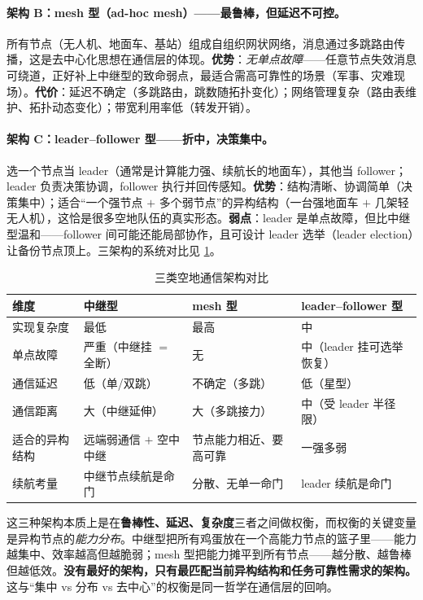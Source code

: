 \paragraph{架构 B：mesh 型（ad-hoc mesh）——最鲁棒，但延迟不可控。}
所有节点（无人机、地面车、基站）组成自组织网状网络，消息通过多跳路由传播，这是去中心化思想在通信层的体现。\textbf{优势}：\emph{无单点故障}——任意节点失效消息可绕道，正好补上中继型的致命弱点，最适合需高可靠性的场景（军事、灾难现场）。\textbf{代价}：延迟不确定（多跳路由，跳数随拓扑变化）；网络管理复杂（路由表维护、拓扑动态变化）；带宽利用率低（转发开销）。

\paragraph{架构 C：leader--follower 型——折中，决策集中。}
选一个节点当 leader（通常是计算能力强、续航长的地面车），其他当 follower；leader 负责决策协调，follower 执行并回传感知。\textbf{优势}：结构清晰、协调简单（决策集中）；适合“一个强节点 $+$ 多个弱节点”的异构结构（一台强地面车 $+$ 几架轻无人机），这恰是很多空地队伍的真实形态。\textbf{弱点}：leader 是单点故障，但比中继型温和——follower 间可能还能局部协作，且可设计 leader 选举（leader election）让备份节点顶上。三架构的系统对比见 \cref{tab:hmr-comm-compare}。

\begin{table}[H]\centering\small
\caption{三类空地通信架构对比}
\label{tab:hmr-comm-compare}
\begin{tabular}{llll}
\toprule
维度 & 中继型 & mesh 型 & leader--follower 型 \\
\midrule
实现复杂度 & 最低 & 最高 & 中 \\
单点故障 & 严重（中继挂 $=$ 全断） & 无 & 中（leader 挂可选举恢复） \\
通信延迟 & 低（单/双跳） & 不确定（多跳） & 低（星型） \\
通信距离 & 大（中继延伸） & 大（多跳接力） & 中（受 leader 半径限） \\
适合的异构结构 & 远端弱通信 $+$ 空中中继 & 节点能力相近、要高可靠 & 一强多弱 \\
续航考量 & 中继节点续航是命门 & 分散、无单一命门 & leader 续航是命门 \\
\bottomrule
\end{tabular}
\end{table}

\begin{insight}
这三种架构本质上是在\textbf{鲁棒性、延迟、复杂度}三者之间做权衡，而权衡的关键变量是异构节点的\emph{能力分布}。中继型把所有鸡蛋放在一个高能力节点的篮子里——能力越集中、效率越高但越脆弱；mesh 型把能力摊平到所有节点——越分散、越鲁棒但越低效。\textbf{没有最好的架构，只有最匹配当前异构结构和任务可靠性需求的架构。}这与“集中 vs 分布 vs 去中心”的权衡是同一哲学在通信层的回响。
\end{insight}

